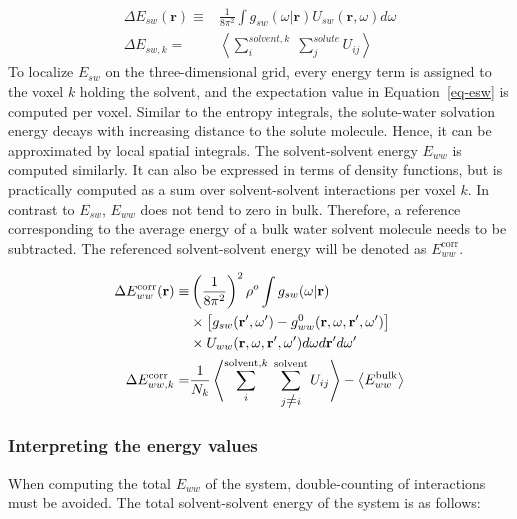 \documentclass[9pt,tutorial,pubversion]{livecoms}
\renewcommand{\neq}{\setbox0\hbox{=}\rlap{\hbox to \wd0{\hss /\hss}}\box0}
\begin{document}
\begin{equation}
	\begin{aligned}
		\label{eq-esw}
		\Delta E_{sw}(\textbf{r}) \equiv& \frac{1}{8\pi^2} \int g_\textit{sw}\left(\omega|\textbf{r}\right) U_\textit{sw}\left(\textbf{r}, \omega\right) d\omega \\
		\Delta E_{sw,k}=& \left\langle \sum_i^{\textit{solvent},k} \; \sum_j^\textit{solute} U_{ij}\right\rangle
	\end{aligned}
\end{equation}
To localize $E_{sw}$ on the three-dimensional grid, every energy term is assigned to the voxel $k$ holding the solvent, and the expectation value in Equation~\ref{eq-esw} is computed per voxel.
Similar to the entropy integrals, the solute-water solvation energy decays with increasing distance to the solute molecule.
Hence, it can be approximated by local spatial integrals. 
The solvent-solvent energy $E_{ww}$ is computed similarly.
It can also be expressed in terms of density functions, but is practically computed as a sum over solvent-solvent interactions per voxel $k$.
In contrast to $E_{sw}$, $E_{ww}$ does not tend to zero in bulk.
Therefore, a reference corresponding to the average energy of a bulk water solvent molecule needs to be subtracted.
The referenced solvent-solvent energy will be denoted as $E_{ww}^\text{corr}$.

\begin{equation}
	\begin{aligned}
		\Delta E_{ww}^\text{corr}(\textbf{r}) \equiv & \left(\frac{1}{8\pi^2} \right)^2 \rho^o \int g_{sw}(\omega|\textbf{r}) \\
			& \times \left[g_{sw}(\textbf{r}^\prime , \omega^\prime) - g^0_{ww} (\textbf{r}, \omega, \textbf{r}^\prime, \omega^\prime )\right] \\
			& \times U_{ww}(\textbf{r}, \omega, \textbf{r}^\prime, \omega^\prime)d\omega d\textbf{r}^\prime d\omega^\prime \\
		\Delta E_{ww,k}^\text{corr} =& \frac{1}{N_k} \left\langle \sum_i^{\text{solvent},k} \; \sum_{j \neq i}^\text{solvent} U_{ij}\right\rangle - \left\langle E_{ww}^\text{bulk}\right\rangle
	\end{aligned}
\end{equation}

\subsubsection{Interpreting the energy values}
When computing the total $E_{ww}$ of the system, double-counting of interactions must be avoided.
The total solvent-solvent energy of the system is as follows:
\end{document}
